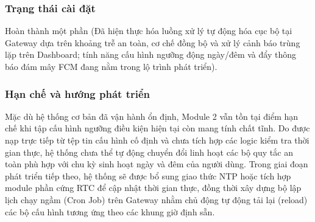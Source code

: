 



\subsubsection{Trạng thái cài đặt}
Hoàn thành một phần (Đã hiện thực hóa luồng xử lý tự động hóa cục bộ tại Gateway dựa trên khoảng trễ an toàn, cơ chế đồng bộ và xử lý cảnh báo trùng lặp trên Dashboard; tính năng cấu hình ngưỡng động ngày/đêm và đẩy thông báo đám mây FCM đang nằm trong lộ trình phát triển).

\subsubsection{Hạn chế và hướng phát triển}
Mặc dù hệ thống cơ bản đã vận hành ổn định, Module 2 vẫn tồn tại điểm hạn chế khi tập cấu hình ngưỡng điều kiện hiện tại còn mang tính chất tĩnh. Do được nạp trực tiếp từ tệp tin cấu hình cố định và chưa tích hợp các logic kiểm tra thời gian thực, hệ thống chưa thể tự động chuyển đổi linh hoạt các bộ quy tắc an toàn phù hợp với chu kỳ sinh hoạt ngày và đêm của người dùng. Trong giai đoạn phát triển tiếp theo, hệ thống sẽ được bổ sung giao thức NTP hoặc tích hợp module phần cứng RTC để cập nhật thời gian thực, đồng thời xây dựng bộ lập lịch chạy ngầm (Cron Job) trên Gateway nhằm chủ động tự động tải lại (reload) các bộ cấu hình tương ứng theo các khung giờ định sẵn.

